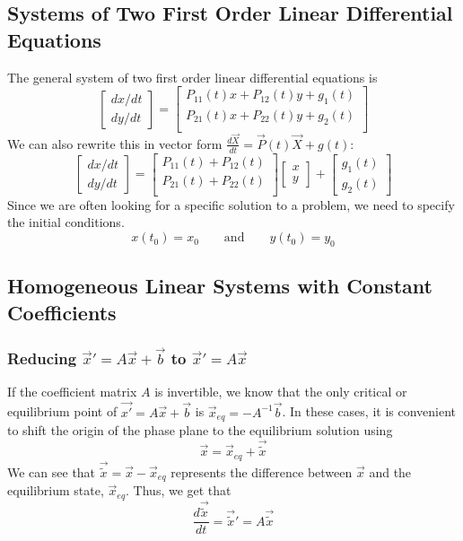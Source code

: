 \documentclass[11pt]{article}
\begin{document}
\subsection{Systems of Two First Order Linear Differential Equations}
The general system of two first order linear differential equations is
$$\begin{bmatrix}
dx/dt \\
dy/dt
\end{bmatrix}
= \begin{bmatrix}
P_{11}(t)x + P_{12}(t)y + g_1(t) \\
P_{21}(t)x + P_{22}(t)y + g_2(t) \\
\end{bmatrix}$$
We can also rewrite this in vector form $\frac{d \vec{X}}{dt} = \vec{P}(t)\vec{X}+g(t)$:
$$\begin{bmatrix}
dx/dt \\
dy/dt
\end{bmatrix}
= \begin{bmatrix}
P_{11}(t) + P_{12}(t)\\
P_{21}(t) + P_{22}(t)\\
\end{bmatrix}
\begin{bmatrix}
x \\
y
\end{bmatrix}
+
\begin{bmatrix}
g_1(t) \\
g_2(t)
\end{bmatrix}
$$
Since we are often looking for a specific solution to a problem, we need to specify the initial conditions.
$$ x(t_0) = x_0 \quad \quad \text{and} \quad \quad y(t_0) = y_0$$
\subsection{Homogeneous Linear Systems with Constant Coefficients}
\subsubsection{Reducing $\vec{x}' = A\vec{x} + \vec{b}$ to $\vec{x}' = A\vec{x}$}
If the coefficient matrix $A$ is invertible, we know that the only critical or equilibrium point of $\vec{x'} = A\vec{x} + \vec{b}$ is $\vec{x}_{eq} = -A^{-1}\vec{b}$. In these cases, it is convenient to shift the origin of the phase plane to the equilibrium solution using
$$\vec{x} = \vec{x}_{eq} + \vec{\tilde{x}}$$
We can see that $\vec{\tilde{x}} = \vec{x} - \vec{x}_{eq}$ represents the difference between $\vec{x}$ and the equilibrium state, $\vec{x}_{eq}$. Thus, we get that
$$\frac{d\vec{\tilde{x}}}{dt} = \vec{\tilde{x}}' = A\vec{\tilde{x}}$$
\end{document}
